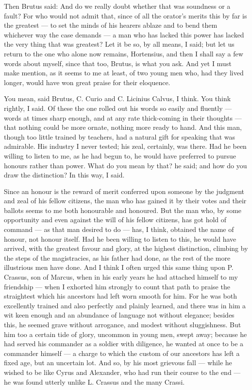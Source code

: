  Then Brutus said: And do we really doubt whether that was soundness or a fault? For who would not admit that, since of all the orator's merits this by far is the greatest — to set the minds of his hearers ablaze and to bend them whichever way the case demands — a man who has lacked this power has lacked the very thing that was greatest? Let it be so, by all means, I said; but let us return to the one who alone now remains, Hortensius, and then I shall say a few words about myself, since that too, Brutus, is what you ask. And yet I must make mention, as it seems to me at least, of two young men who, had they lived longer, would have won great praise for their eloquence.

 You mean, said Brutus, C. Curio and C. Licinius Calvus, I think. You think rightly, I said. Of these the one rolled out his words so easily and fluently — words at times sharp enough, and at any rate thick-coming in their thoughts — that nothing could be more ornate, nothing more ready to hand. And this man, though too little trained by teachers, had a natural gift for speaking that was admirable. His industry I never tested; his zeal, certainly, was there. Had he been willing to listen to me, as he had begun to, he would have preferred to pursue honours rather than power. What do you mean by that? he said; and how do you draw the distinction? In this way, I said.

 Since an honour is the reward of merit conferred upon someone by the judgment and zeal of his fellow citizens, the man who has gained it by their votes and their ballots seems to me both honourable and honoured. But the man who, by some opportunity and even against the will of his fellow citizens, has got hold of command — as that man desired to do — has, I think, obtained the name of honour, not honour itself. Had he been willing to listen to this, he would have arrived, with the greatest favour and glory, at the highest distinction, climbing by the steps of the magistracies, as his father had done, as the rest of the more illustrious men have done. And I think I often urged this same thing upon P. Crassus, son of Marcus, when in his early years he had attached himself to my friendship — when I exhorted him strongly to count that path to praise the straightest which his ancestors had left worn smooth for him. For he was both excellently trained and also perfectly and plainly learned, and there was in him a wit keen enough and an abundance of language not without elegance; besides this, he seemed grave without arrogance, and modest without sluggishness. But him too a certain tide of glory, uncommon in young men, swept away; because he had served his commander as a soldier with diligence, he wanted at once to be a commander himself — a charge to which the custom of our ancestors has left a fixed age, but an uncertain lot. And so, by his most grievous fall — while he wished to be like Cyrus and Alexander, who had run their course to the end — he was found utterly unlike L. Crassus and the many Crassi.

